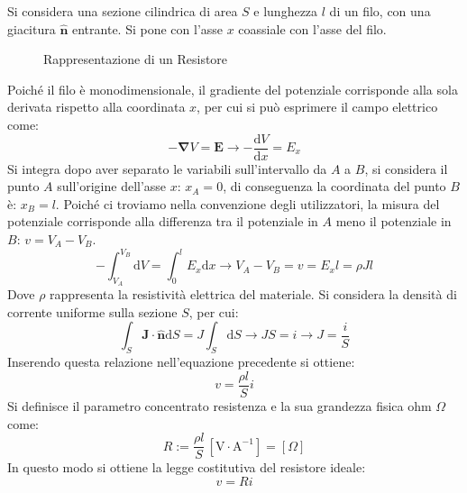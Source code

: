 \documentclass{article}
\newcommand{\vect}[1]{\boldsymbol{\mathbf{#1}}}
\newcommand{\df}{\mathrm{d}}
\newcommand{\SI}[1]{\mathrm{#1}}
\numberwithin{equation}{subsection}
\begin{document}
Si considera una sezione cilindrica di area $S$ e lunghezza $l$ di un filo, con una giacitura $\hat{\vect{n}}$ entrante. Si pone con l'asse $x$ coassiale con l'asse del filo. 

\begin{figure}[H]%
    \centering
    \qquad
    \caption{Rappresentazione di un Resistore}
    \label{fig:rappresentazione-resistore}
\end{figure}

Poiché il filo è monodimensionale, il gradiente del potenziale corrisponde alla sola derivata rispetto alla coordinata $x$, per cui si può esprimere il campo elettrico come:
\begin{equation*}
    -\vect\nabla V=\vect{E}\to\displaystyle-\frac{\df V}{\df  x}=E_x
\end{equation*}
Si integra dopo aver separato le variabili sull'intervallo da $A$ a $B$, si considera il punto $A$ sull'origine dell'asse $x$: $x_A=0$, di conseguenza la coordinata del punto 
$B$ è: $x_B=l$. Poiché ci troviamo nella convenzione degli utilizzatori, la misura del potenziale corrisponde alla differenza tra il potenziale in $A$ meno il potenziale in $B$:
$v=V_A-V_B$. 
\begin{equation*}
    \displaystyle-\int_{V_A}^{V_B}\df V=\int_0^lE_x\df x\to V_A-V_B=v=E_xl=\rho Jl
\end{equation*}
Dove $\rho$ rappresenta la resistività elettrica del materiale. Si considera la densità di corrente uniforme sulla sezione $S$, per cui:
\begin{equation*}
    \displaystyle\int_S\vect{J}\cdot\hat{\vect{n}}\df S=J\int_S\df S\to JS=i\to J=\frac{i}{S}
\end{equation*}
Inserendo questa relazione nell'equazione precedente si ottiene:
\begin{equation*}
    v=\displaystyle\frac{\rho l}{S}i
\end{equation*}
Si definisce il parametro concentrato resistenza e la sua grandezza fisica ohm $\Omega$ come:
\begin{equation*}
    R:=\displaystyle\frac{\rho  l}{S}\,\left[\SI{V}\cdot\SI{A}^{-1}\right]=[\Omega]
\end{equation*}
In questo modo si ottiene la legge costitutiva del resistore ideale:
\begin{equation}
    v=Ri
\end{equation}
\end{document}
